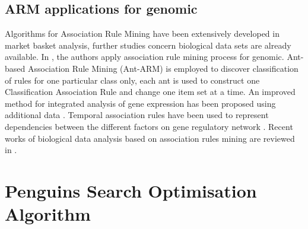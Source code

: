 \documentclass[preprint,12pt]{elsarticle}
\begin{document}
\subsection{ARM applications for genomic}
Algorithms for Association Rule Mining have been extensively developed in market basket analysis, further studies concern  biological data sets are already available.
 In \cite{23}, the authors apply association rule mining process for genomic. 
 Ant-based Association Rule Mining (Ant-ARM) is employed to discover classification of rules for one particular class only, each ant is used to construct one  Classification Association Rule and change one item set at a time. An improved method for integrated analysis of gene expression has been 
 proposed using additional data \cite{24}. Temporal association rules have been used to represent dependencies between the different factors 
 on gene regulatory network \cite{25}. Recent works of biological data analysis based on association rules mining are reviewed in \cite{26}.

\section{Penguins Search Optimisation Algorithm }
\end{document}
